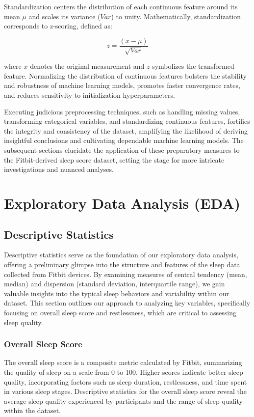 \documentclass[10pt]{extarticle}
\begin{document}
Standardization centers the distribution of each continuous feature around its mean \(\mu{}\) and scales its variance (\(Var\)) to unity. Mathematically, standardization corresponds to z-scoring, defined as:

\[
z = \frac{(x - \mu)}{\sqrt{Var}}
\]

where \(x\) denotes the original measurement and \(z\) symbolizes the transformed feature. Normalizing the distribution of continuous features bolsters the stability and robustness of machine learning models, promotes faster convergence rates, and reduces sensitivity to initialization hyperparameters.

Executing judicious preprocessing techniques, such as handling missing values, transforming categorical variables, and standardizing continuous features, fortifies the integrity and consistency of the dataset, amplifying the likelihood of deriving insightful conclusions and cultivating dependable machine learning models. The subsequent sections elucidate the application of these preparatory measures to the Fitbit-derived sleep score dataset, setting the stage for more intricate investigations and nuanced analyses.

\section{Exploratory Data Analysis (EDA)}

\subsection{Descriptive Statistics}

Descriptive statistics serve as the foundation of our exploratory data analysis, offering a preliminary glimpse into the structure and features of the sleep data collected from Fitbit devices. By examining measures of central tendency (mean, median) and dispersion (standard deviation, interquartile range), we gain valuable insights into the typical sleep behaviors and variability within our dataset. This section outlines our approach to analyzing key variables, specifically focusing on overall sleep score and restlessness, which are critical to assessing sleep quality.

\subsubsection{Overall Sleep Score}

The overall sleep score is a composite metric calculated by Fitbit, summarizing the quality of sleep on a scale from 0 to 100. Higher scores indicate better sleep quality, incorporating factors such as sleep duration, restlessness, and time spent in various sleep stages. Descriptive statistics for the overall sleep score reveal the average sleep quality experienced by participants and the range of sleep quality within the dataset.
\end{document}
